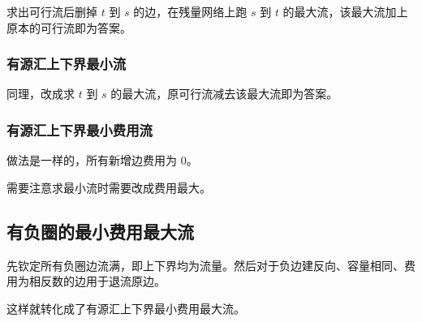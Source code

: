 求出可行流后删掉 $t$ 到 $s$ 的边，在残量网络上跑 $s$ 到 $t$ 的最大流，该最大流加上原本的可行流即为答案。

\subsubsection{有源汇上下界最小流}

同理，改成求 $t$ 到 $s$ 的最大流，原可行流减去该最大流即为答案。

\subsubsection{有源汇上下界最小费用流}

做法是一样的，所有新增边费用为 $0$。

需要注意求最小流时需要改成费用最大。

\subsection{有负圈的最小费用最大流}

先钦定所有负圈边流满，即上下界均为流量。然后对于负边建反向、容量相同、费用为相反数的边用于退流原边。

这样就转化成了有源汇上下界最小费用最大流。